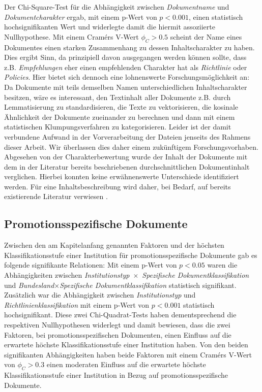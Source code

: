 Der Chi-Square-Test für die Abhängigkeit zwischen \textit{Dokumentname} und \textit{Dokumentcharakter} ergab, mit einem p-Wert von $p<\num{0.001}$, einen statistisch hochsignifikanten Wert und widerlegte damit die hiermit assoziierte Nullhypothese.
Mit einem Cramérs V-Wert $\phi_C>\num{0,5}$ scheint der Name eines Dokumentes einen starken Zusammenhang zu dessen Inhaltscharakter zu haben.
Dies ergibt Sinn, da prinzipiell davon ausgegangen werden können sollte, dass z.B. \textit{Empfehlungen} eher einen empfehlenden Charakter hat als \textit{Richtlinie} oder \textit{Policies}.
Hier bietet sich dennoch eine lohnenswerte Forschungsmöglichkeit an:
Da Dokumente mit teils demselben Namen unterschiedlichen Inhaltscharakter besitzen, wäre es interessant, den Textinhalt aller Dokumente z.B. durch Lemmatisierung zu standardisieren, die Texte zu vektorisieren, die kosinale Ähnlichkeit der Dokumente zueinander zu berechnen und dann mit einem statistischen Klumpungsverfahren zu kategorisieren.
Leider ist der damit verbundene Aufwand in der Vorverarbeitung der Dateien jenseits des Rahmens dieser Arbeit.
Wir überlassen dies daher einem zukünftigem Forschungsvorhaben.
Abgesehen von der Charakterbewertung wurde der Inhalt der Dokumente mit dem in der Literatur bereits beschriebenen durchschnittlichen Dokumentinhalt verglichen.
Hierbei konnten keine erwähnenswerte Unterschiede identifiziert werden.
Für eine Inhaltsbeschreibung wird daher, bei Bedarf, auf bereits existierende Literatur verwiesen \autocite{Hiemenz2018-fdm-title,Hiemenz2018-fdm-report}.

\subsection{Promotionsspezifische Dokumente}\label{sec:policy-discussion-specific}
Zwischen den am Kapitelanfang genannten Faktoren und der höchsten Klassifikationsstufe einer Institution für promotionsspezifische Dokumente gab es folgende signifikante Relationen:
Mit einem p-Wert von $p<\num{0,05}$ waren die Abhängigkeiten zwischen \textit{Institutionstyp}~$\times$~\textit{Spezifische Dokumentklassifikation} und \textit{Bundesland}$\times$\textit{Spezifische Dokumentklassifikation} statistisch signifikant.
Zusätzlich war die Abhängigkeit zwischen \textit{Institutionstyp} und \textit{Richtlinienklassifikation} mit einem p-Wert von $p<\num{0,001}$ statistisch hochsignifikant.
Diese zwei Chi-Quadrat-Tests haben dementsprechend die respektiven Nullhypothesen widerlegt und damit bewiesen, dass die zwei Faktoren, bei promotionsspezifischen Dokumenten, einen Einfluss auf die erwartete höchste Klassifikationsstufe einer Institution haben.
Von den beiden signifikanten Abhängigkeiten haben beide Faktoren mit einem Cramérs V-Wert von $\phi_C>\num{0.3}$ einen moderaten Einfluss auf die erwartete höchste Klassifikationsstufe einer Institution in Bezug auf promotionsspezifische Dokumente.

